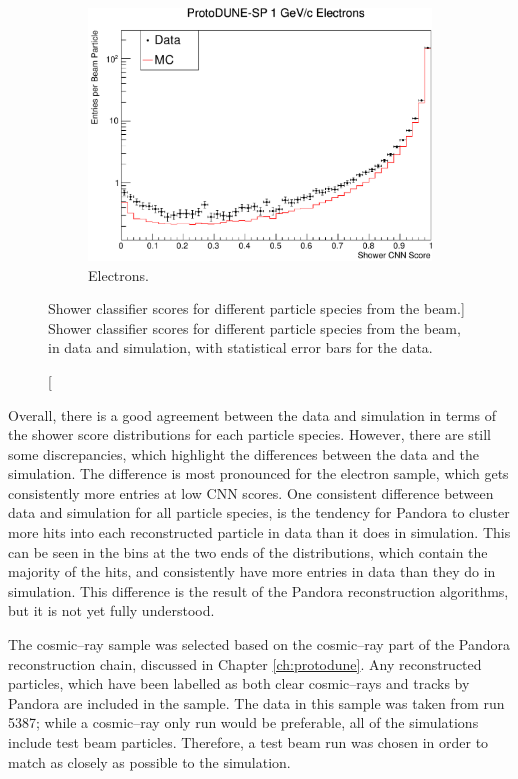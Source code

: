 \begin{figure}
	\begin{subfigure}[b]{0.64\textwidth}
		\centering
		\includegraphics[width=\textwidth]{figures/hit_cnn_electron.pdf}
		\caption {Electrons.}
		\label{fig:beam_electron_cnn}
	\end{subfigure}

	\caption
	[Shower classifier scores for different particle species from the \protodune{} 
	beam.]
	{Shower classifier scores for different particle species from the \protodune{} 
	beam, in data and simulation, with statistical error bars for the data.}
	\label{fig:cnn_scores_beam}

\end{figure}

Overall, there is a good agreement between the data and simulation in terms of
the shower score distributions for each particle species. However, there are
still some discrepancies, which highlight the differences between the data and
the simulation. The difference is most pronounced for the electron sample, which
gets consistently more entries at low CNN scores. One consistent difference
between data and simulation for all particle species, is the tendency for 
Pandora to cluster more hits into each reconstructed particle in data than it 
does in simulation. This can be seen in the bins at the two ends of the 
distributions, which contain the majority of the hits, and consistently have 
more entries in data than they do in simulation. This difference is the result
of the Pandora reconstruction algorithms, but it is not yet fully understood.

The cosmic--ray sample was selected based on the cosmic--ray part of the
Pandora reconstruction chain, discussed in Chapter \ref{ch:protodune}. Any
reconstructed particles, which have been labelled as both clear cosmic--rays
and tracks by Pandora are included in the sample. The data in this sample was
taken from run 5387; while a cosmic--ray only run would be preferable, all of 
the \protodune{} simulations include test beam particles. Therefore, a test beam
run was chosen in order to match as closely as possible to the simulation.

